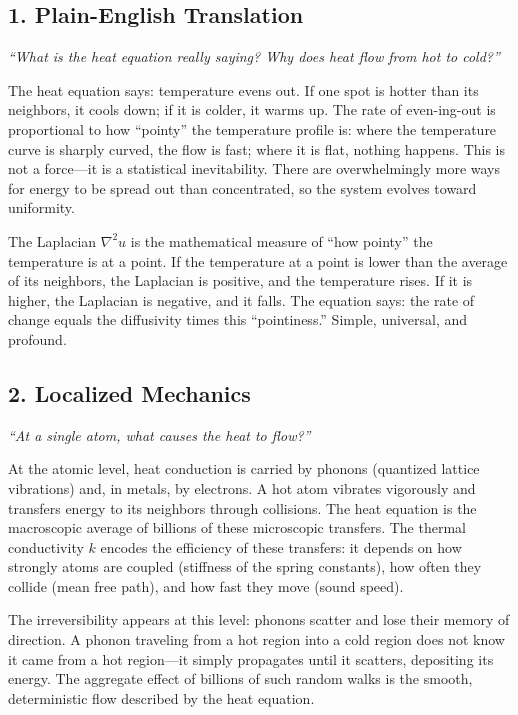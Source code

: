 \documentclass[11pt,openright]{book}
\begin{document}
\subsection*{1. Plain-English Translation}
\textit{``What is the heat equation really saying? Why does heat flow from hot to cold?''}

The heat equation says: temperature evens out. If one spot is hotter than its neighbors, it cools down; if it is colder, it warms up. The rate of even-ing-out is proportional to how ``pointy'' the temperature profile is: where the temperature curve is sharply curved, the flow is fast; where it is flat, nothing happens. This is not a force---it is a statistical inevitability. There are overwhelmingly more ways for energy to be spread out than concentrated, so the system evolves toward uniformity.

The Laplacian $\nabla^2 u$ is the mathematical measure of ``how pointy'' the temperature is at a point. If the temperature at a point is lower than the average of its neighbors, the Laplacian is positive, and the temperature rises. If it is higher, the Laplacian is negative, and it falls. The equation says: the rate of change equals the diffusivity times this ``pointiness.'' Simple, universal, and profound.

\subsection*{2. Localized Mechanics}
\textit{``At a single atom, what causes the heat to flow?''}

At the atomic level, heat conduction is carried by phonons (quantized lattice vibrations) and, in metals, by electrons. A hot atom vibrates vigorously and transfers energy to its neighbors through collisions. The heat equation is the macroscopic average of billions of these microscopic transfers. The thermal conductivity $k$ encodes the efficiency of these transfers: it depends on how strongly atoms are coupled (stiffness of the spring constants), how often they collide (mean free path), and how fast they move (sound speed).

The irreversibility appears at this level: phonons scatter and lose their memory of direction. A phonon traveling from a hot region into a cold region does not know it came from a hot region---it simply propagates until it scatters, depositing its energy. The aggregate effect of billions of such random walks is the smooth, deterministic flow described by the heat equation.
\end{document}
